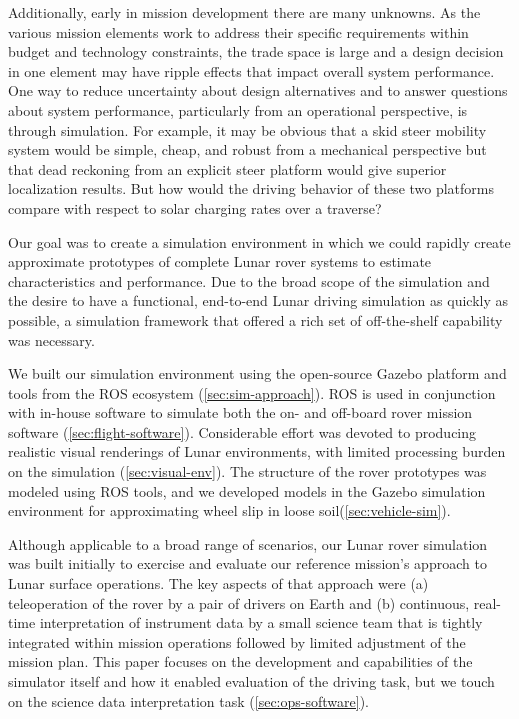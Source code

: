 \documentclass[twocolumn,letterpaper]{IEEEAerospaceCLS}  %
\begin{document}

Additionally, early in mission development there are many unknowns.
As the various mission elements work to address their specific requirements within budget and technology constraints, the trade space is large and a design decision in one element may have ripple effects that impact overall system performance.  
One way to reduce uncertainty about design alternatives and to answer questions about system performance, particularly from an operational perspective, is through simulation.  
For example, it may be obvious that a skid steer mobility system would be simple, cheap, and robust from a mechanical perspective but that dead reckoning from an explicit steer platform would give superior localization results.  
But how would the driving behavior of these two platforms compare with respect to solar charging rates over a traverse? 

Our goal was to create a simulation environment in which we could rapidly create approximate prototypes of complete Lunar rover systems to estimate characteristics and performance.  
Due to the broad scope of the simulation and the desire to have a functional, end-to-end Lunar driving simulation as quickly as possible, a simulation framework that offered a rich set of off-the-shelf capability was necessary.  

We built our simulation environment using the open-source Gazebo platform and tools from the ROS ecosystem (\cref{sec:sim-approach}).  
ROS is used in conjunction with in-house software to simulate both the on- and off-board rover mission software (\cref{sec:flight-software}).  
Considerable effort was devoted to producing realistic visual renderings of Lunar environments, with limited processing burden on the simulation (\cref{sec:visual-env}).  
The structure of the rover prototypes was modeled using ROS tools, and we developed models in the Gazebo simulation environment for approximating wheel slip in loose soil(\cref{sec:vehicle-sim}).  

Although applicable to a broad range of scenarios, our Lunar rover simulation was built initially to exercise and evaluate our reference mission's approach to Lunar surface operations.
The key aspects of that approach were (a) teleoperation of the rover by a pair of drivers on Earth and (b) continuous, real-time interpretation of instrument data by a small science team that is tightly integrated within mission operations followed by limited adjustment of the mission plan.
This paper focuses on the development and capabilities of the simulator itself and how it enabled evaluation of the driving task, but we touch on the science data interpretation task (\cref{sec:ops-software}).
\end{document}
